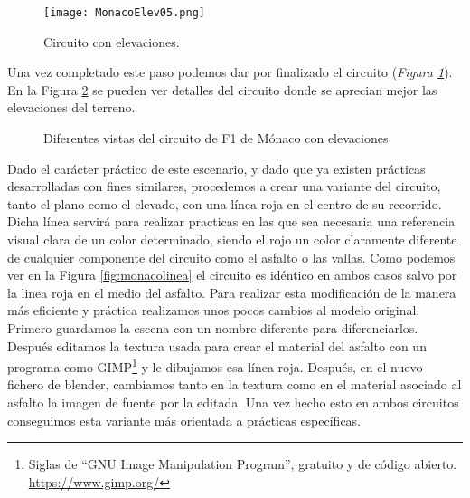 \begin{figure}[hb]
	\centering
	\texttt{[image: MonacoElev05.png]}
	\caption{Circuito con elevaciones.} \label{fig:monacoelev05}
\end{figure}

Una vez completado este paso podemos dar por finalizado el circuito (\textit{Figura \ref{fig:monacoelev05}}). En la Figura \ref{fig:monacoelevvistas} se pueden ver detalles del circuito donde se aprecian mejor las elevaciones del terreno.

\begin{figure}[h]
	\centering
	\hspace{0.04\textwidth}	
	\vspace{0.03\textwidth}
	\hspace{0.04\textwidth}
	\caption{Diferentes vistas del circuito de F1 de Mónaco con elevaciones} \label{fig:monacoelevvistas}
\end{figure}

Dado el carácter práctico de este escenario, y dado que ya existen prácticas desarrolladas con fines similares, procedemos a crear una variante del circuito, tanto el plano como el elevado, con una línea roja en el centro de su recorrido. Dicha línea servirá para realizar practicas en las que sea necesaria una referencia visual clara de un color determinado, siendo el rojo un color claramente diferente de cualquier componente del circuito como el asfalto o las vallas. Como podemos ver en la Figura \ref{fig:monacolinea} el circuito es idéntico en ambos casos salvo por la linea roja en el medio del asfalto. Para realizar esta modificación de la manera más eficiente y práctica realizamos unos pocos cambios al modelo original. Primero guardamos la escena con un nombre diferente para diferenciarlos. Después editamos la textura usada para crear el material del asfalto con un programa como GIMP\footnote{Siglas de “GNU Image Manipulation Program”, gratuito y de código abierto. \url{https://www.gimp.org/}} y le dibujamos esa línea roja. Después, en el nuevo fichero de blender, cambiamos tanto en la textura como en el material asociado al asfalto la imagen de fuente por la editada. Una vez hecho esto en ambos circuitos conseguimos esta variante más orientada a prácticas específicas. 

